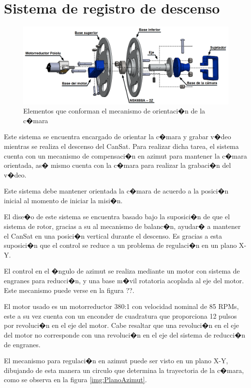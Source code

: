 \documentclass[10pt,a4paper]{book}
\begin{document}
\section*{Sistema de registro de descenso}

\begin{figure}[H]
\begin{center}
\includegraphics[scale=0.35]{Imagenes/Partesregistro.png}  
\caption{\label{fig:MecAzimut}Elementos que conforman el mecanismo de orientaci�n de la c�mara}
\end{center}
\end{figure}
Este sistema se encuentra encargado de orientar la c�mara y grabar v�deo mientras se realiza el descenso del CanSat. Para realizar dicha tarea, el sistema cuenta con un mecanismo de compensaci�n en azimut para mantener la c�mara orientada, as� mismo cuenta con la c�mara para realizar la grabaci�n del v�deo.

Este sistema debe mantener orientada la c�mara de acuerdo a la posici�n inicial al momento de iniciar la misi�n.

El dise�o de este sistema se encuentra basado bajo la suposici�n de que el sistema de rotor, gracias a su al mecanismo de balanc�n, ayudar� a mantener el CanSat en una posici�n vertical durante el descenso. Es gracias a esta suposici�n que el control se reduce a un problema de regulaci�n en un plano X-Y.


El control en el �ngulo de azimut se realiza mediante un motor con sistema de engranes para reducci�n, y una base m�vil rotatoria acoplada al eje del motor. Este mecanismo puede verse en la figura ??.

El motor usado es un motorreductor 380:1 con velocidad nominal de 85 RPMs, este a su vez cuenta con un enconder de cuadratura que proporciona 12 pulsos por revoluci�n en el eje del motor. Cabe resaltar que una revoluci�n en el eje del motor no corresponde con una revoluci�n en el eje del sistema de reducci�n de engranes.

El mecanismo para regulaci�n en azimut puede ser visto en un plano X-Y, dibujando de esta manera un circulo que determina la trayectoria de la c�mara, como se observa en la figura \ref{img:PlanoAzimut}.
\end{document}

